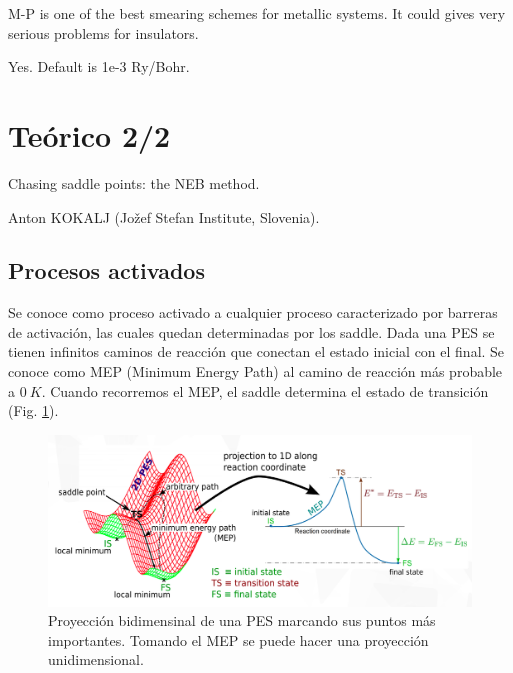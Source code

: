 
    M-P is one of the best smearing schemes for metallic systems. It could gives very serious problems for insulators.


    Yes. Default is 1e-3 Ry/Bohr.

\section{Teórico 2/2}

     Chasing saddle points: the NEB method.

    	Anton KOKALJ (Jožef Stefan Institute, Slovenia).

\subsection{Procesos activados}

  Se conoce como proceso activado a cualquier proceso caracterizado por barreras de activación, las cuales quedan determinadas por los saddle. Dada una PES se tienen infinitos caminos de reacción que conectan el estado inicial con el final. Se conoce como MEP (Minimum Energy Path) al camino de reacción más probable a $0\ K$. Cuando recorremos el MEP, el saddle determina el estado de transición (Fig. \ref{fig:saddle}).

  \begin{figure}[H]
      \centering
      \includegraphics[scale = 0.4]{figs/D3/saddle.png}
      \caption{Proyección bidimensinal de una PES marcando sus puntos más importantes. Tomando el MEP se puede hacer una proyección unidimensional.}
      \label{fig:saddle}
  \end{figure}


